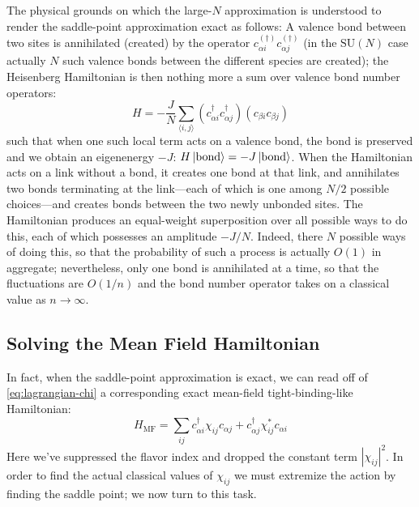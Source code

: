 \documentclass{report}
\begin{document}
The physical grounds on which the large-$ N $ approximation is understood to
render the saddle-point approximation exact as follows: A valence bond between 
two sites is annihilated (created) by the operator $ c_{\alpha i}^{(\dagger)}
c_{\alpha j}^{(\dagger)}$ (in the $ \text{SU}(N) $ case actually $ N $ such
valence bonds between the different species are created); 
the Heisenberg Hamiltonian is then nothing more a sum over valence bond number
operators:
\begin{equation*}
	H = -\frac{J}{N}\sum_{\langle i,j \rangle}\left(c_{\alpha i}^\dagger
	c_{\alpha j}^\dagger\right)
	\left(c_{\beta i}c_{\beta j}\right)
\end{equation*}
such that when one such local term acts on a valence bond, the bond is preserved
and we obtain an eigenenergy $ -J $: $ H \ket{\text{bond}} = -J
\ket{\text{bond}}$. When the Hamiltonian acts on a link without a bond, it 
creates one bond at that link, and annihilates two bonds terminating at the
link---each of which is one among $ N/2 $ possible choices---and creates
bonds between the two newly unbonded sites. The Hamiltonian produces an equal-weight
superposition over all possible ways to do this, each of which possesses an
amplitude $ -J/N $. Indeed, there $ N $ possible ways of doing this, 
so that the probability of such a process is actually $ O(1) $ in aggregate;
nevertheless, only one bond is annihilated at a time, so that the fluctuations
are $ O(1/n) $ and the bond number operator takes on a classical value as $ n
\rightarrow \infty $. 

\subsection{Solving the Mean Field Hamiltonian}
In fact, when the saddle-point approximation is exact, we can read off of 
\cref{eq:lagrangian-chi} a corresponding exact mean-field tight-binding-like
Hamiltonian: 
\begin{equation}\label{eq:h-mf}
	H_{\text{MF}}
	= \sum_{ij}c_{\alpha i}^\dagger \chi_{ij} c_{\alpha j}
				+ c_{\alpha j}^\dagger \chi_{ij}^\ast c_{\alpha i}
\end{equation}
Here we've suppressed the flavor index and dropped the constant term $
|\chi_{ij}|^2 $. In order to find the actual classical values of $ \chi_{ij} $
we must extremize the action by finding the saddle point; we now turn to this 
task. 
\end{document}
